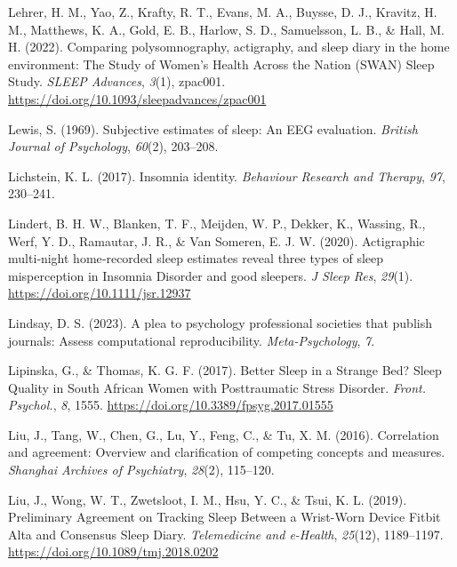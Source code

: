 \documentclass[
]{article}
\newlength{\cslhangindent}
\newenvironment{CSLReferences}[2] %
 {\begin{list}{}{%
  \setlength{\itemindent}{0pt}
  \setlength{\leftmargin}{0pt}
  \setlength{\parsep}{0pt}
  \ifodd #1
   \setlength{\leftmargin}{\cslhangindent}
   \setlength{\itemindent}{-1\cslhangindent}
  \fi
  \setlength{\itemsep}{#2\baselineskip}}}
 {\end{list}}
\begin{document}
\begin{CSLReferences}{1}{0}
Lehrer, H. M., Yao, Z., Krafty, R. T., Evans, M. A., Buysse, D. J., Kravitz, H. M., Matthews, K. A., Gold, E. B., Harlow, S. D., Samuelsson, L. B., \& Hall, M. H. (2022). Comparing polysomnography, actigraphy, and sleep diary in the home environment: {The} {Study} of {Women}'s {Health} {Across} the {Nation} ({SWAN}) {Sleep} {Study}. \emph{SLEEP Advances}, \emph{3}(1), zpac001. \url{https://doi.org/10.1093/sleepadvances/zpac001}

Lewis, S. (1969). Subjective estimates of sleep: An EEG evaluation. \emph{British Journal of Psychology}, \emph{60}(2), 203--208.

Lichstein, K. L. (2017). Insomnia identity. \emph{Behaviour Research and Therapy}, \emph{97}, 230--241.

Lindert, B. H. W., Blanken, T. F., Meijden, W. P., Dekker, K., Wassing, R., Werf, Y. D., Ramautar, J. R., \& Van Someren, E. J. W. (2020). Actigraphic multi‐night home‐recorded sleep estimates reveal three types of sleep misperception in {Insomnia} {Disorder} and good sleepers. \emph{J Sleep Res}, \emph{29}(1). \url{https://doi.org/10.1111/jsr.12937}

Lindsay, D. S. (2023). A plea to psychology professional societies that publish journals: Assess computational reproducibility. \emph{Meta-Psychology}, \emph{7}.

Lipinska, G., \& Thomas, K. G. F. (2017). Better {Sleep} in a {Strange} {Bed}? {Sleep} {Quality} in {South} {African} {Women} with {Posttraumatic} {Stress} {Disorder}. \emph{Front. Psychol.}, \emph{8}, 1555. \url{https://doi.org/10.3389/fpsyg.2017.01555}

Liu, J., Tang, W., Chen, G., Lu, Y., Feng, C., \& Tu, X. M. (2016). Correlation and agreement: Overview and clarification of competing concepts and measures. \emph{Shanghai Archives of Psychiatry}, \emph{28}(2), 115--120.

Liu, J., Wong, W. T., Zwetsloot, I. M., Hsu, Y. C., \& Tsui, K. L. (2019). Preliminary {Agreement} on {Tracking} {Sleep} {Between} a {Wrist}-{Worn} {Device} {Fitbit} {Alta} and {Consensus} {Sleep} {Diary}. \emph{Telemedicine and e-Health}, \emph{25}(12), 1189--1197. \url{https://doi.org/10.1089/tmj.2018.0202}


\end{CSLReferences}
\end{document}
